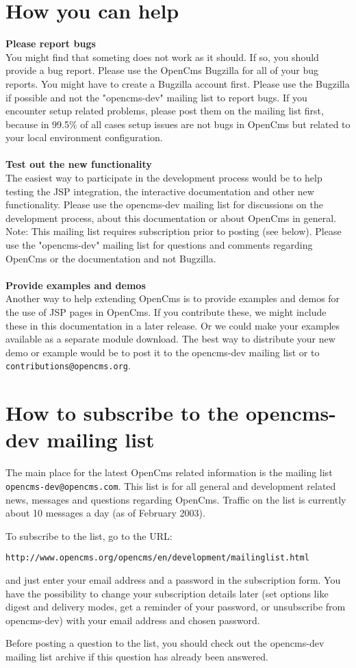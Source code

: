\section{How you can help}
{\bf Please report bugs}\\
You might find that someting does not work as it should. If so, you should provide a bug report. 
Please use the OpenCms Bugzilla for all of your bug reports. You might have to create a Bugzilla 
account first. Please use the Bugzilla if possible and not the "opencms-dev" mailing list to report 
bugs. If you encounter setup related problems, please post them on the mailing list first, because 
in 99.5\% of all cases setup issues are not bugs in OpenCms but related to your local environment
configuration.\\
\\
{\bf Test out the new functionality}\\
The easiest way to participate in the development process would be to help testing the JSP integration, 
the interactive documentation and other new functionality. Please use the opencms-dev mailing list for 
discussions on the development process, about this documentation or about OpenCms in general. Note: This 
mailing list requires subscription prior to posting (see below). Please use the "opencms-dev" mailing list 
for questions and comments regarding OpenCms or the documentation and not Bugzilla.\\
\\
{\bf Provide examples and demos}\\
Another way to help extending OpenCms is to provide examples and demos for the use of JSP pages in OpenCms. 
If you contribute these, we might include these in this documentation in a later release. Or we could make 
your examples available as a separate module download. The best way to distribute your new demo or example 
would be to post it to the opencms-dev mailing list or to {\tt contributions@opencms.org}.

\section{How to subscribe to the opencms-dev mailing list}
The main place for the latest OpenCms related information is the mailing list\\ {\tt opencms-dev@opencms.com}. 
This list is for all general and development related news, messages and questions regarding OpenCms.
Traffic on the list is currently about 10 messages a day (as of February 2003).

To subscribe to the list, go to the URL:

{\tt http://www.opencms.org/opencms/en/development/mailinglist.html}

and just enter your email address and a password in the subscription form.
You have the possibility to change your subscription details later (set options like digest and delivery modes, get a reminder of your password, or unsubscribe from opencms-dev)
with your email address and chosen password.

Before posting a question to the list, you should check out the opencms-dev mailing list archive if this question 
has already been answered.